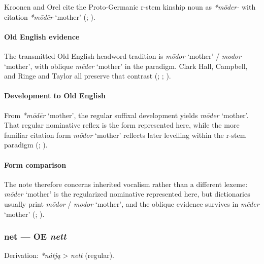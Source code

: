 \documentclass[
  british,
  a4paper,
]{article}
\providecommand{\Recon}[1]{\emph{*#1}}
\begin{document}
Kroonen and Orel cite the Proto-Germanic r-stem kinship noun as
\emph{*mōder-} with citation \Recon{mōdēr} `mother'
(; ).

\paragraph{Old English evidence}\label{old-english-evidence-43}

The transmitted Old English headword tradition is \emph{mōdor} `mother'
/ \emph{modor} `mother', with oblique \emph{mēder} `mother' in the
paradigm. Clark Hall, Campbell, and Ringe and Taylor all preserve that
contrast (;
;
).

\paragraph{Development to Old
English}\label{development-to-old-english-43}

From \Recon{mōdēr} `mother', the regular suffixal development yields
\emph{mōder} `mother'. That regular nominative reflex is the form
represented here, while the more familiar citation form \emph{mōdor}
`mother' reflects later levelling within the r-stem paradigm
(;
).

\paragraph{Form comparison}\label{form-comparison-3}

The note therefore concerns inherited vocalism rather than a different
lexeme: \emph{mōder} `mother' is the regularized nominative represented
here, but dictionaries usually print \emph{mōdor} / \emph{modor}
`mother', and the oblique evidence survives in \emph{mēder} `mother'
(;
).

\subsubsection{\texorpdfstring{net --- OE
\emph{nett}}{net --- OE nett}}\label{net-oe-nett}

Derivation: \emph{*nátją} \textgreater{} \emph{nett} (regular).
\end{document}

